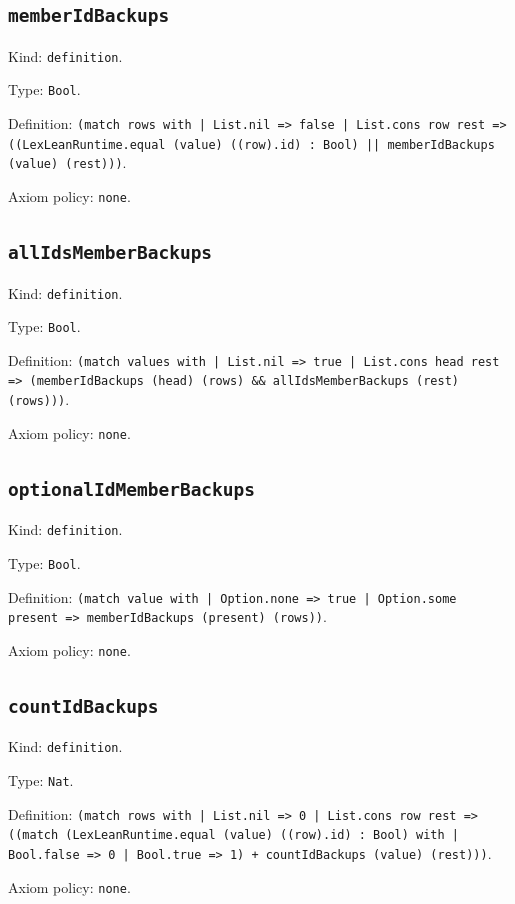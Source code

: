\documentclass[11pt]{article}
\begin{document}
\subsection*{\texttt{memberIdBackups}}
\noindent Kind: \texttt{definition}.\par
\noindent Type: \texttt{Bool}.\par
\noindent Definition: \texttt{(match rows with | List.nil => false | List.cons row rest => ((LexLeanRuntime.equal (value) ((row).id) : Bool) || memberIdBackups (value) (rest)))}.\par
\noindent Axiom policy: \texttt{none}.\par
\subsection*{\texttt{allIdsMemberBackups}}
\noindent Kind: \texttt{definition}.\par
\noindent Type: \texttt{Bool}.\par
\noindent Definition: \texttt{(match values with | List.nil => true | List.cons head rest => (memberIdBackups (head) (rows) \&\& allIdsMemberBackups (rest) (rows)))}.\par
\noindent Axiom policy: \texttt{none}.\par
\subsection*{\texttt{optionalIdMemberBackups}}
\noindent Kind: \texttt{definition}.\par
\noindent Type: \texttt{Bool}.\par
\noindent Definition: \texttt{(match value with | Option.none => true | Option.some present => memberIdBackups (present) (rows))}.\par
\noindent Axiom policy: \texttt{none}.\par
\subsection*{\texttt{countIdBackups}}
\noindent Kind: \texttt{definition}.\par
\noindent Type: \texttt{Nat}.\par
\noindent Definition: \texttt{(match rows with | List.nil => 0 | List.cons row rest => ((match (LexLeanRuntime.equal (value) ((row).id) : Bool) with | Bool.false => 0 | Bool.true => 1) + countIdBackups (value) (rest)))}.\par
\noindent Axiom policy: \texttt{none}.\par
\end{document}
